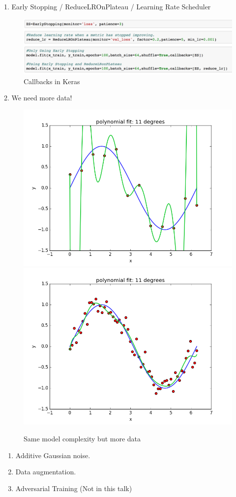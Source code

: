 \documentclass[handout,xcolor=pdftex,dvipsnames,table,mathserif]{beamer}
\begin{document}
\begin{frame}{1. Early Stopping / ReduceLROnPlateau / Learning Rate Scheduler}
\begin{figure}
\includegraphics[width=1 \columnwidth]{../graphics/CallBacksKeras}
\caption{Callbacks in Keras}
\end{figure}
\end{frame}

\begin{frame}{2. We need more data!}
\begin{figure}
\includegraphics[width=.45 \columnwidth]{../graphics/polyfit_degree_11}
\includegraphics[width=.45 \columnwidth]{../graphics/polyfit_degree_11_N60.png}
\caption{Same model complexity but more data}
\end{figure}
\begin{enumerate}
\item Additive Gaussian noise.
\item Data augmentation.
\item Adversarial Training (Not in this talk)
\end{enumerate}
\end{frame}
\end{document}

